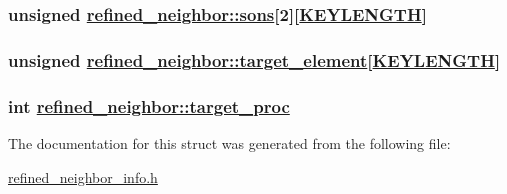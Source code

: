 \hypertarget{structrefined__neighbor_o4}{
\subsubsection[sons]{\setlength{\rightskip}{0pt plus 5cm}unsigned \hyperlink{structrefined__neighbor_o4}{refined\_\-neighbor::sons}\mbox{[}2\mbox{]}\mbox{[}\hyperlink{constant_8h_a10}{KEYLENGTH}\mbox{]}}}
\label{structrefined__neighbor_o4}


\hypertarget{structrefined__neighbor_o2}{
\subsubsection[target\_\-element]{\setlength{\rightskip}{0pt plus 5cm}unsigned \hyperlink{structrefined__neighbor_o2}{refined\_\-neighbor::target\_\-element}\mbox{[}\hyperlink{constant_8h_a10}{KEYLENGTH}\mbox{]}}}
\label{structrefined__neighbor_o2}


\hypertarget{structrefined__neighbor_o0}{
\subsubsection[target\_\-proc]{\setlength{\rightskip}{0pt plus 5cm}int \hyperlink{structrefined__neighbor_o0}{refined\_\-neighbor::target\_\-proc}}}
\label{structrefined__neighbor_o0}




The documentation for this struct was generated from the following file:\begin{CompactItemize}
\item 
\hyperlink{refined__neighbor__info_8h}{refined\_\-neighbor\_\-info.h}\end{CompactItemize}
